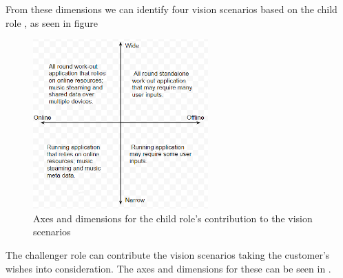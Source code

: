 
From these dimensions we can identify four vision scenarios based on the child role  \cite[ pp. 132-134]{essence}, as seen in figure 

\begin{figure}[h!]
  \centering
    \includegraphics[width=0.6\textwidth]{Images/axis1.PNG}
    \caption{Axes and dimensions for the child role's contribution to the vision scenarios}
    \label{fig:axis1}
\end{figure}


The challenger role can contribute the vision scenarios taking the customer's wishes into consideration. The axes and dimensions for these can be seen in .

